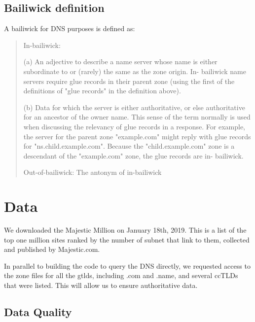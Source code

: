 \documentclass{idc_msc}
\begin{document}
\subsection{Bailiwick definition}

A bailiwick for DNS purposes is defined\cite{rfc7719} as:

\begin{quote}
In-bailiwick:

      (a) An adjective to describe a name server whose name is either
      subordinate to or (rarely) the same as the zone origin.  In-
      bailiwick name servers require glue records in their parent zone
      (using the first of the definitions of "glue records" in the
      definition above).

      (b) Data for which the server is either authoritative, or else
      authoritative for an ancestor of the owner name.  This sense of
      the term normally is used when discussing the relevancy of glue
      records in a response.  For example, the server for the parent
      zone "example.com" might reply with glue records for
      "ns.child.example.com".  Because the "child.example.com" zone is a
      descendant of the "example.com" zone, the glue records are in-
      bailiwick.

   Out-of-bailiwick:  The antonym of in-bailiwick
\end{quote}

\section{Data}

We downloaded the Majestic Million\cite{MajesticMillion} on January 18th, 2019.
This is a list of the top one million sites ranked by the number of subnet that link to them, collected and published by Majestic.com.


In parallel to building the code to query the DNS directly, we requested access to the zone files for all the gtlds, including .com and .name, and several ccTLDs that were listed.
This will allow us to ensure authoritative data.
\subsection{Data Quality}

\end{document}

